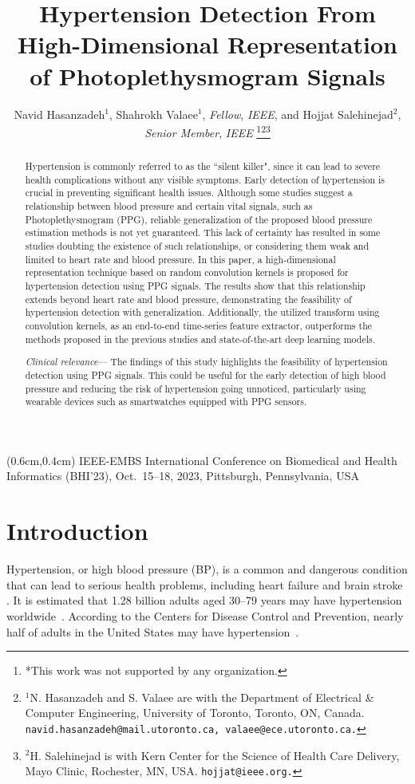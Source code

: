 \documentclass[letterpaper, 10 pt, conference]{ieeeconf}
\title{\LARGE \bf
Hypertension Detection From High-Dimensional Representation of Photoplethysmogram Signals}
\author{Navid Hasanzadeh$^{1}$, Shahrokh Valaee$^{1}$, \textit{Fellow}, \textit{IEEE}, and Hojjat Salehinejad$^{2}$, \textit{Senior Member}, \textit{IEEE} \thanks{*This work was not supported by any organization.}\thanks{$^{1}$N. Hasanzadeh and S. Valaee are with the Department of Electrical \& Computer Engineering, University of Toronto, Toronto, ON, Canada. {\tt\small  navid.hasanzadeh@mail.utoronto.ca, valaee@ece.utoronto.ca.}}\thanks{$^{2}$H. Salehinejad is with Kern Center for the Science of Health Care Delivery, Mayo Clinic, Rochester, MN, USA. {\tt\small hojjat@ieee.org.}}}
\begin{document}
\begin{textblock*}{20cm}(0.6cm,0.4cm) IEEE-EMBS International Conference on Biomedical and Health Informatics (BHI’23), Oct.\ 15--18, 2023, Pittsburgh, Pennsylvania, USA
\end{textblock*}
\maketitle
\thispagestyle{empty}
\pagestyle{empty}

\begin{abstract}



Hypertension is commonly referred to as the ``silent killer", since it can lead to severe health complications without any visible symptoms. Early detection of hypertension is crucial in preventing significant health issues. Although some studies suggest a relationship between blood pressure and certain vital signals, such as Photoplethysmogram (PPG), reliable generalization of the proposed blood pressure estimation methods is not yet guaranteed. This lack of certainty has resulted in some studies doubting the existence of such relationships, or considering them weak and limited to heart rate and blood pressure. In this paper, a high-dimensional representation technique based on random convolution kernels is proposed for hypertension detection using PPG signals. The results show that this relationship extends beyond heart rate and blood pressure, demonstrating the feasibility of hypertension detection with generalization. Additionally, the utilized transform using convolution kernels, as an end-to-end time-series feature extractor, outperforms the methods proposed in the previous studies and state-of-the-art deep learning models.

\indent \textit{Clinical relevance}— The findings of this study highlights the feasibility of hypertension detection using PPG signals. This could be useful for the early detection of high blood pressure and reducing the risk of hypertension going unnoticed, particularly using wearable devices such as smartwatches equipped with PPG sensors.
\end{abstract}



\section{Introduction}

Hypertension, or high blood pressure (BP), is a common and dangerous condition that can lead to serious health problems, including heart failure and brain stroke \cite{kalehoff2020story}. It is estimated that 1.28 billion adults aged 30–79 years may have hypertension worldwide~\cite{world2022world}. According to the Centers for Disease Control and Prevention, nearly half of adults in the United States may have hypertension~\cite{HypertensionUSA}. 
\end{document}
